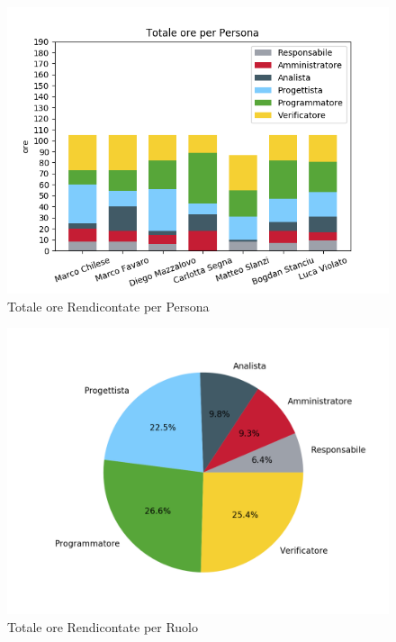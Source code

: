 \begin{center}
	\begin{figure}[H]
		\includegraphics[scale=0.9]{./images/totPersonaOre.png}
		\caption{Totale ore Rendicontate per Persona}
	\end{figure}
	\begin{figure}[H]
		\includegraphics[scale=0.7]{./images/torta_totPersonaOre.png}
		\caption{Totale ore Rendicontate per Ruolo}
	\end{figure}
\end{center}

\newpage
